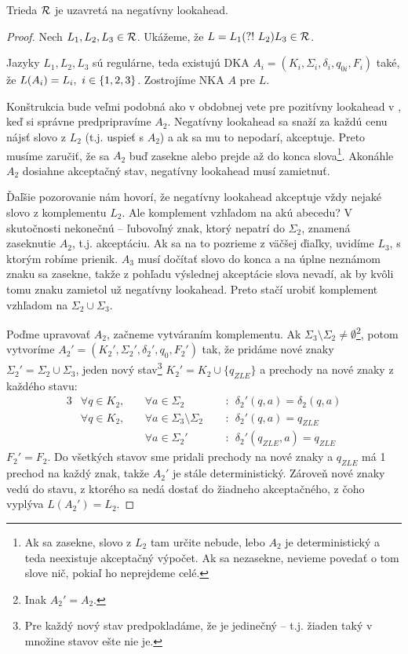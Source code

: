 \begin{lema}\label{nla+R}
Trieda ${\cal R}$ je uzavretá na negatívny lookahead.
\end{lema}
\begin{proof}
Nech $L_1,L_2,L_3 \in {\cal R}$. Ukážeme, že $L=L_1\text{(?!~} L_2)L_3 \in {\cal R}$.

Jazyky $ L_{1},L_{2},L_{3} $ sú regulárne, teda existujú DKA $ A_{i} = (K_{i},\Sigma_{i},\delta_{i},q_{0i},F_{i}) $ také, že $ L(A_{i})=\nobreak L_{i},\allowbreak~ i \in \lbrace 1,2,3\rbrace $. Zostrojíme NKA $A$ pre $L$.

Konštrukcia bude veľmi podobná ako v obdobnej vete pre pozitívny lookahead v \cite{mojaBak}, keď si správne predpripravíme $A_2$. Negatívny lookahead sa snaží za každú cenu nájsť slovo z $L_2$ (t.j. uspieť s $A_2$) a ak sa mu to nepodarí, akceptuje. Preto musíme zaručiť, že sa $A_2$ buď zasekne alebo prejde až do konca slova\footnote{Ak sa zasekne, slovo z $L_2$ tam určite nebude, lebo $A_2$ je deterministický a teda neexistuje akceptačný výpočet. Ak sa nezasekne, nevieme povedať o tom slove nič, pokiaľ ho neprejdeme celé.}. Akonáhle $A_2$ dosiahne akceptačný stav, negatívny lookahead musí zamietnuť. 

Ďaľšie pozorovanie nám hovorí, že negatívny lookahead akceptuje vždy nejaké slovo z komplementu $L_2$. Ale komplement vzhľadom na akú abecedu? V skutočnosti nekonečnú -- ľubovoľný znak, ktorý nepatrí do $\Sigma_2$, znamená zaseknutie $A_2$, t.j. akceptáciu. Ak sa na to pozrieme z väčšej ďiaľky, uvidíme $L_3$, s ktorým robíme prienik. $A_3$ musí dočítať slovo do konca a na úplne neznámom znaku sa zasekne, takže z pohľadu výslednej akceptácie slova nevadí, ak by kvôli tomu znaku zamietol už negatívny lookahead. Preto stačí urobiť komplement vzhľadom na $\Sigma_2 \cup \Sigma_3$. 

Poďme upravovať $A_2$, začneme vytváraním komplementu. Ak $\Sigma_3 \setminus \Sigma_2 \neq\emptyset$\footnote{Inak $A_2'=A_2$.}, potom vytvoríme $A_2'= (K_2',\Sigma_2',\delta_2',q_{0},F_2')$ tak, že pridáme nové znaky $\Sigma_2'=\Sigma_2 \cup \Sigma_3$,  jeden nový stav\footnote{Pre každý nový stav predpokladáme, že je jedinečný -- t.j. žiaden taký v množine stavov ešte nie je.} $K_2'=K_2 \cup \lbrace q_{ZLE} \rbrace$ a prechody na nové znaky z každého stavu: 
\begin{alignat*}{3}
& \forall q \in K_2, &&~ \forall a \in \Sigma_2 &&~~:~~  \delta_2'(q,a)=\delta_2(q,a) \\
& \forall q \in K_2, &&~ \forall a \in \Sigma_3 \setminus \Sigma_2 &&~~:~~ \delta_2'(q,a)=q_{ZLE} \\
&~&&~ \forall a \in \Sigma_2' &&~~:~~  \delta_2'(q_{ZLE},a)=q_{ZLE}
\end{alignat*}
 $F_2'=F_2.$ Do všetkých stavov sme pridali prechody na nové znaky a $q_{ZLE}$ má 1 prechod na každý znak, takže $A_2'$ je stále deterministický. Zároveň nové znaky vedú do stavu, z ktorého sa nedá dostať do žiadneho akceptačného, z čoho vyplýva $L(A_2')=L_2$.


\end{proof}

